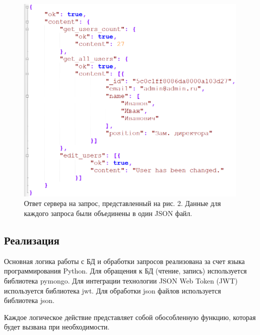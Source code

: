 \documentclass[14pt, a4paper]{extarticle}
\begin{document}
    \begin{figure}[h]
        \centering
        \includegraphics[width=1\linewidth]{img/ans.png}
        \caption{Ответ сервера на запрос, представленный на рис. 2. Данные для каждого запроса были объединены в один JSON файл.}
        \label{fig:ans}
    \end{figure}


    \clearpage
    \subsection{Реализация}
    Основная логика работы с БД и обработки запросов реализована за счет языка программирования Python. Для обращения к БД (чтение, запись) используется библиотека pymongo. Для интеграции технологии JSON Web Token (JWT) используется библиотека jwt. Для обработки json файлов используется библиотека json.

    Каждое логическое действие представляет собой обособленную функцию, которая будет вызвана при необходимости.

    

    

    
\end{document}
